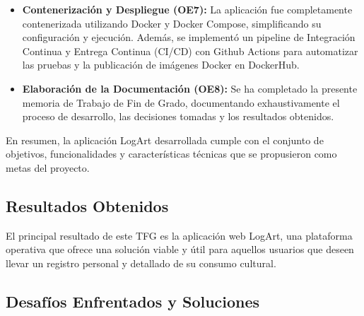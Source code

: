 \begin{itemize}
\begin{itemize}
        \item \textbf{Contenerización y Despliegue (OE7):} La aplicación fue completamente contenerizada utilizando Docker y Docker Compose, simplificando su configuración y ejecución. Además, se implementó un pipeline de Integración Continua y Entrega Continua (CI/CD) con Github Actions para automatizar las pruebas y la publicación de imágenes Docker en DockerHub.
        \item \textbf{Elaboración de la Documentación (OE8):} Se ha completado la presente memoria de Trabajo de Fin de Grado, documentando exhaustivamente el proceso de desarrollo, las decisiones tomadas y los resultados obtenidos.
    \end{itemize}
\end{itemize}

En resumen, la aplicación LogArt desarrollada cumple con el conjunto de objetivos, funcionalidades y características técnicas que se propusieron como metas del proyecto.

\subsection{Resultados Obtenidos}
\label{ssec:resultadosObtenidos}

El principal resultado de este TFG es la aplicación web LogArt, una plataforma operativa que ofrece una solución viable y útil para aquellos usuarios que deseen llevar un registro personal y detallado de su consumo cultural.

\subsection{Desafíos Enfrentados y Soluciones}
\label{ssec:desafiosSoluciones}

